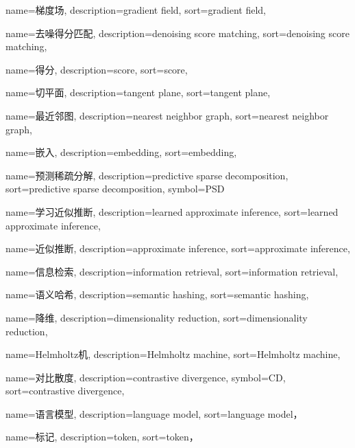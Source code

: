 {
  name=梯度场,
  description={gradient field},
  sort={gradient field},
}

{
  name=去噪得分匹配,
  description={denoising score matching},
  sort={denoising score matching},
}

{
  name=得分,
  description={score},
  sort={score},
}

{
  name=切平面,
  description={tangent plane},
  sort={tangent plane},
}

{
  name=最近邻图,
  description={nearest neighbor graph},
  sort={nearest neighbor graph},
}

{
  name=嵌入,
  description={embedding},
  sort={embedding},
}

{
  name=预测稀疏分解,
  description={predictive sparse decomposition},
  sort={predictive sparse decomposition},
  symbol={PSD}
}

{
  name=学习近似推断,
  description={learned approximate inference},
  sort={learned approximate inference},
}

{
  name=近似推断,
  description={approximate inference},
  sort={approximate inference},
}

{
  name=信息检索,
  description={information retrieval},
  sort={information retrieval},
}

{
  name=语义哈希,
  description={semantic hashing},
  sort={semantic hashing},
}

{
  name=降维,
  description={dimensionality reduction},
  sort={dimensionality reduction},
}

{
  name=Helmholtz机,
  description={Helmholtz machine},
  sort={Helmholtz machine},
}

{
  name=对比散度,
  description={contrastive divergence},
  symbol={CD},
  sort={contrastive divergence},
}

{
  name=语言模型,
  description={language model},
  sort={language model}，
}

{
  name=标记,
  description={token},
  sort={token}，
}

